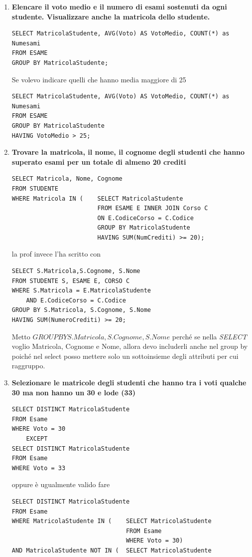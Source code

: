 \documentclass{article}
\begin{document}
\begin{enumerate}
\item \textbf{Elencare il voto medio e il numero di esami sostenuti da ogni studente. Visualizzare anche la matricola dello studente.}
\begin{lstlisting}[style=sqlstyle]
SELECT MatricolaStudente, AVG(Voto) AS VotoMedio, COUNT(*) as Numesami
FROM ESAME
GROUP BY MatricolaStudente;
\end{lstlisting}
Se volevo indicare quelli che hanno media maggiore di 25
\begin{lstlisting}[style=sqlstyle]
SELECT MatricolaStudente, AVG(Voto) AS VotoMedio, COUNT(*) as Numesami
FROM ESAME
GROUP BY MatricolaStudente
HAVING VotoMedio > 25;
\end{lstlisting}
\item \textbf{Trovare la matricola, il nome, il cognome degli studenti che hanno superato esami per un totale di almeno 20 crediti}
\begin{lstlisting}[style=sqlstyle]
SELECT Matricola, Nome, Cognome
FROM STUDENTE 
WHERE Matricola IN (	SELECT MatricolaStudente
						FROM ESAME E INNER JOIN Corso C
						ON E.CodiceCorso = C.Codice
						GROUP BY MatricolaStudente
						HAVING SUM(NumCrediti) >= 20);
\end{lstlisting}
la prof invece l'ha scritto con
\begin{lstlisting}[style=sqlstyle]
SELECT S.Matricola,S.Cognome, S.Nome
FROM STUDENTE S, ESAME E, CORSO C
WHERE S.Matricola = E.MatricolaStudente 
	AND E.CodiceCorso = C.Codice
GROUP BY S.Matricola, S.Cognome, S.Nome 
HAVING SUM(NumeroCrediti) >= 20;
\end{lstlisting}
Metto $GROUP BY S.Matricola, S.Cognome, S.Nome $ perché se nella \textit{SELECT} voglio Matricola, Cognome e Nome, allora devo includerli anche nel group by poiché nel select posso mettere solo un sottoinsieme degli attributi per cui raggruppo.
\item \textbf{Selezionare le matricole degli studenti che hanno tra i voti qualche 30 ma non hanno un 30 e lode (33)}
\begin{lstlisting}[style=sqlstyle]
SELECT DISTINCT MatricolaStudente
FROM Esame
WHERE Voto = 30
	EXCEPT
SELECT DISTINCT MatricolaStudente
FROM Esame
WHERE Voto = 33
\end{lstlisting}
oppure è ugualmente valido fare
\begin{lstlisting}[style=sqlstyle]
SELECT DISTINCT MatricolaStudente
FROM Esame
WHERE MatricolaStudente IN (	SELECT MatricolaStudente
								FROM Esame
								WHERE Voto = 30)
AND MatricolaStudente NOT IN (	SELECT MatricolaStudente

\end{lstlisting}
\end{enumerate}
\end{document}
